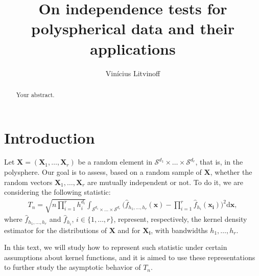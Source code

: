 \documentclass{article}
\title{On independence tests for polyspherical data and
their applications}
\author{Vinícius Litvinoff}
\begin{document}
\maketitle

\begin{abstract}
Your abstract.
\end{abstract}

\section{Introduction}

Let $\mathbf{X} = (\mathbf{X}_1, \dots, \mathbf{X}_r)$ be a random element in $\mathcal{S}^{d_1} \times \dots \times \mathcal{S}^{d_r}$, that is, in the polysphere. Our goal is to assess, based on a random sample of $\mathbf{X}$, whether the random vectors $\mathbf{X}_1, \dots, \mathbf{X}_r$ are mutually independent or not. To do it, we are considering the following statistic:
\begin{align}
    T_n = \sqrt{n \prod_{i = 1}^{r} h_i^{d_i}} \int_{\mathcal{S}^{d_1} \times \dots \times \mathcal{S}^{d_r}} \Big( \hat{f}_{h_1, \dots, h_r}(\mathbf{x}) - \prod_{i = 1}^{r} \hat{f}_{h_i}(\mathbf{x_i}) \Big)^2 \mathrm{d} \mathbf{x},
\end{align}
where $\hat{f}_{h_1, \dots, h_r}$ and $\hat{f}_{h_i}$, $i \in \{ 1, \dots, r \}$, represent, respectively, the kernel density estimator for the distributions of $\mathbf{X}$ and for $\mathbf{X_i}$, with bandwidths $h_1, \dots, h_r$.

In this text, we will study how to represent such statistic under certain assumptions about kernel functions, and it is aimed to use these representations to further study the asymptotic behavior of $T_n$.
\end{document}
